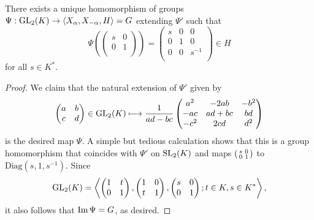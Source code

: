 \begin{theorem}\label{thm:globalsl2}
    There exists a unique homomorphism of groups $\Psi:\mathrm{GL}_2(K)\to\langle X_\alpha,X_{-\alpha},H\rangle=G$
    extending $\Psi'$ such that 
    $$\Psi\left(\begin{pmatrix}
        s & 0\\
        0 & 1\\
    \end{pmatrix}\right)=\begin{pmatrix}
        s & 0 & 0\\
        0 & 1 & 0\\
        0 & 0 & s^{-1}\\
    \end{pmatrix}\in H$$
    for all $s\in K^*$.
\end{theorem}
\begin{proof}
    We claim that the natural extension of $\Psi'$ given by 
    $$\begin{pmatrix}
        a & b\\
        c & d\\
    \end{pmatrix}\in\mathrm{GL}_2(K)\longmapsto\frac{1}{ad-bc}\begin{pmatrix}
        a^2 & -2ab & -b^2\\
        -ac & ad+bc & bd\\
        -c^2 & 2cd & d^2\\
    \end{pmatrix}$$
    is the desired map $\Psi$. A simple but tedious calculation shows that this is a group homomorphism that coincides with $\Psi'$ on $\mathrm{SL}_2(K)$ and maps $\begin{psmallmatrix}
        s & 0\\
        0 & 1\\
    \end{psmallmatrix}$
    to $\mathrm{Diag}(s,1,s^{-1})$. Since $$\mathrm{GL}_2(K)=\left\langle\begin{pmatrix}
        1 & t\\
        0 & 1\\
    \end{pmatrix},\begin{pmatrix}
        1 & 0\\
        t & 1\\
    \end{pmatrix}, \begin{pmatrix}
        s & 0\\
        0 & 1\\
    \end{pmatrix}; t\in K, s\in K^*\right\rangle,$$
    it also follows that $\operatorname{Im}\Psi=G$, as desired.
\end{proof}

